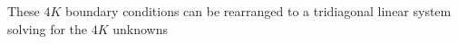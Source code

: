 These $4K$ boundary conditions can be rearranged to a tridiagonal linear system solving for the $4K$ unknowns~\cite{bartels1998hermite}
